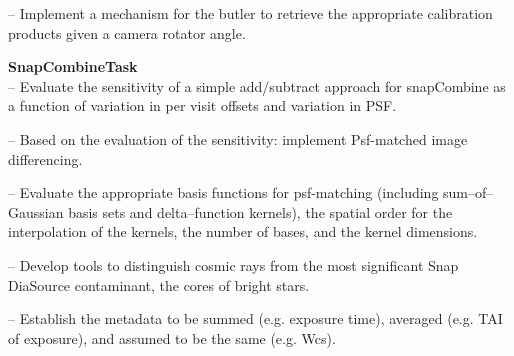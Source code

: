 \documentclass[prd, nofootinbib, floatfix, 11pt,tightenlines,times]{article}
\def\arcsec{^{\prime\prime}}
\begin{document}
-- Implement a mechanism for the butler to retrieve the appropriate calibration products given a camera rotator angle.

{\bf SnapCombineTask}\\
-- Evaluate the sensitivity of a simple add/subtract approach for
snapCombine as a function of variation in per visit offsets and
variation in PSF. 

-- Based on the evaluation of the sensitivity: implement Psf-matched
image differencing.

-- Evaluate the appropriate basis functions for psf-matching
(including sum--of--Gaussian basis sets and delta--function kernels),
the spatial order for the interpolation of the kernels,  the
number of bases, and the kernel dimensions.

-- Develop tools to distinguish cosmic rays from the most significant
Snap DiaSource contaminant, the cores of bright stars.  

-- Establish the metadata to be summed (e.g. exposure time), averaged
(e.g. TAI of exposure), and assumed to be the same (e.g. Wcs).




%

\end{document}
